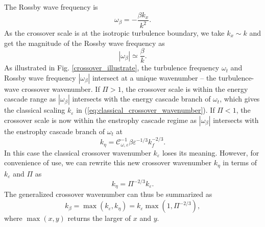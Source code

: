 \documentclass{jfm}
\begin{document}
The Rossby wave frequency is 
\begin{equation}
\omega_{\beta}=-\frac{\beta k_{x}}{k^{2}}.\label{eq:Rossby_wave_freq_kx_k}
\end{equation}
As the crossover scale is at the isotropic turbulence boundary, we
take $k_{x}\sim k$ and get the magnitude of the Rossby wave frequency as
\begin{equation}
|\omega_{\beta}|\simeq\frac{\beta}{k}.\label{eq:Rossby_wave_freq_k}
\end{equation}
As illustrated in Fig. \ref{crossover_illustrate}, the turbulence frequency
$\omega_{t}$ and Rossby wave frequency $|\omega_{\beta}|$ intersect at a
unique wavenumber -- the turbulence-wave crossover wavenumber.
If $\Pi>1$, the crossover scale is within the energy cascade range as
$|\omega_\beta|$ intersects with the energy cascade branch of $\omega_t$,
which gives the classical scaling $k_\varepsilon$ in (\ref{eq:classical_crossover_wavenumber}).
If $\Pi<1$, the crossover scale is now within the enstrophy cascade regime
as $|\omega_\beta|$ intersects with the enstrophy cascade branch of $\omega_t$
at 
\begin{equation}
k_{\eta}=\mathcal{C}_{\omega,\varepsilon}^{-1}\beta\varepsilon^{-1/3}k_{f}^{-2/3}.\label{eq:crossover_k_enstrophy_branch}
\end{equation}
In this case the classical crossover wavenumber $k_\varepsilon$ loses its meaning.
However, for convenience of use, we can rewrite this new crossover wavenumber $k_\eta$
in terms of $k_\varepsilon$ and $\Pi$ as
\begin{equation}
k_{\eta}=\Pi^{-2/3}k_{\varepsilon}.\label{eq:k_eta_k_epsilon_relation}
\end{equation}
The generalized crossover wavenumber can thus be summarized as
\begin{equation}
k_{\beta}=\max(k_{\varepsilon},k_{\eta})=k_{\varepsilon}\max(1,\Pi^{-2/3}),\label{eq:generalized_crossover_wavenumber}
\end{equation}
where $\max(x,y)$ returns the larger of $x$ and $y$. 
\end{document}
